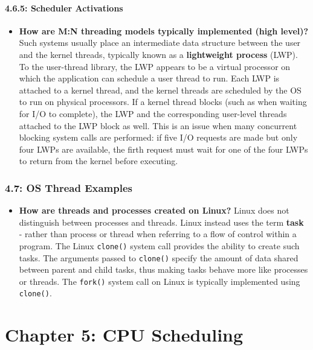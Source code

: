 \documentclass[12pt]{article}
\begin{document}
\subsection*{4.6.5: Scheduler Activations}

\begin{itemize}
    \item \textbf{How are M:N threading models typically implemented (high level)?} Such systems usually place an intermediate data structure between the user and the kernel threads, typically known as a \textbf{lightweight process} (LWP). To the user-thread library, the LWP appears to be a virtual processor on which the application can schedule a user thread to run. Each LWP is attached to a kernel thread, and the kernel threads are scheduled by the OS to run on physical processors. If a kernel thread blocks (such as when waiting for I/O to complete), the LWP and the corresponding user-level threads attached to the LWP block as well. This is an issue when many concurrent blocking system calls are performed: if five I/O requests are made but only four LWPs are available, the firth request must wait for one of the four LWPs to return from the kernel before executing.
\end{itemize}

\section*{4.7: OS Thread Examples}

\begin{itemize}
    \item \textbf{How are threads and processes created on Linux?} Linux does not distinguish between processes and threads. Linux instead uses the term \textbf{task} - rather than process or thread when referring to a flow of control within a program. The Linux \texttt{clone()} system call provides the ability to create such tasks. The arguments passed to \texttt{clone()} specify the amount of data shared between parent and child tasks, thus making tasks behave more like processes or threads. The \texttt{fork()} system call on Linux is typically implemented using \texttt{clone()}.
\end{itemize}

\part*{Chapter 5: CPU Scheduling}
\end{document}
